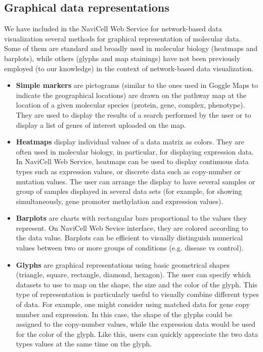 \documentclass[a4,center,fleqn]{NAR}
\begin{document}
\subsection{Graphical data representations}

We have included in the NaviCell Web Service for network-based data visualization several methods
for graphical representation of molecular data. Some of them are standard
and broadly used in molecular biology (heatmaps and barplots), while others (glyphs and map
stainings) have not been previously employed (to our knowledge) in the context of network-based
data visualization.

\begin{itemize}

\item \textbf{Simple markers} are pictograms (similar to the ones used in Goggle Maps
to indicate the geographical locations) are drawn on the pathway map at the location
of a given molecular species (protein, gene, complex, phenotype). They are used to display the
results of a search performed by the user or to display a list of genes of interest
uploaded on the map.

\item \textbf{Heatmaps} display individual values of a data matrix as
colors. They are often used in molecular biology, in particular, for displaying expression
data. In NaviCell Web Service, heatmaps can be used to
display continuous data types such as expression values, or discrete data such
as copy-number or mutation values. The user can arrange the display to have
several samples or group of samples displayed in several data sets
(for example, for showing simultaneously, gene promoter methylation and expression values).

\item \textbf{Barplots} are charts with rectangular bars proportional to the values
they represent. On NaviCell Web Sevice interface, they are colored according to the
data value. Barplots can be efficient to visually distinguish numerical
values between two or more groups of conditions (e.g. disease vs control).

\item \textbf{Glyphs} are graphical representations using basic geometrical
shapes (triangle, square, rectangle, diamond, hexagon). The user can specify
which datasets to use to map on the shape, the size and the color of the glyph. This
type of representation is particularly useful to visually combine different
types of data. For example, one might consider using matched data for
gene copy number and expression. In this case, the shape of the
glyphs could be assigned to the copy-number values, while the expression data
would be used for the color of the glyph. Like this, users can quickly
appreciate the two data types values at the same time on the glyph.


\end{itemize}
\end{document}

